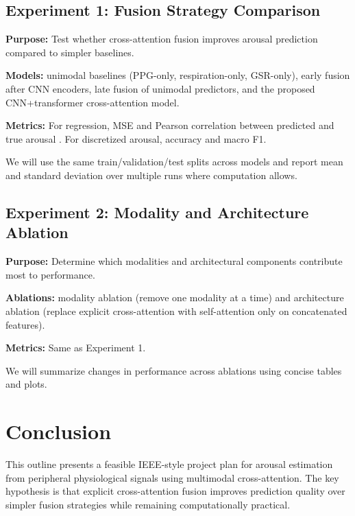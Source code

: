 \documentclass[conference]{IEEEtran}
\begin{document}
\subsection{Experiment 1: Fusion Strategy Comparison}
\textbf{Purpose:} Test whether cross-attention fusion improves arousal prediction compared to simpler baselines.

\textbf{Models:} unimodal baselines (PPG-only, respiration-only, GSR-only), early fusion after CNN encoders, late fusion of unimodal predictors, and the proposed CNN+transformer cross-attention model.

\textbf{Metrics:} For regression, MSE and Pearson correlation between predicted and true arousal \cite{galvao_predicting_2021,choi_arousal_2018}. For discretized arousal, accuracy and macro F1.

We will use the same train/validation/test splits across models and report mean and standard deviation over multiple runs where computation allows.

\subsection{Experiment 2: Modality and Architecture Ablation}
\textbf{Purpose:} Determine which modalities and architectural components contribute most to performance.

\textbf{Ablations:} modality ablation (remove one modality at a time) and architecture ablation (replace explicit cross-attention with self-attention only on concatenated features).

\textbf{Metrics:} Same as Experiment 1.

We will summarize changes in performance across ablations using concise tables and plots.

\section{Conclusion}
This outline presents a feasible IEEE-style project plan for arousal estimation from peripheral physiological signals using multimodal cross-attention. The key hypothesis is that explicit cross-attention fusion improves prediction quality over simpler fusion strategies while remaining computationally practical.



\end{document}
